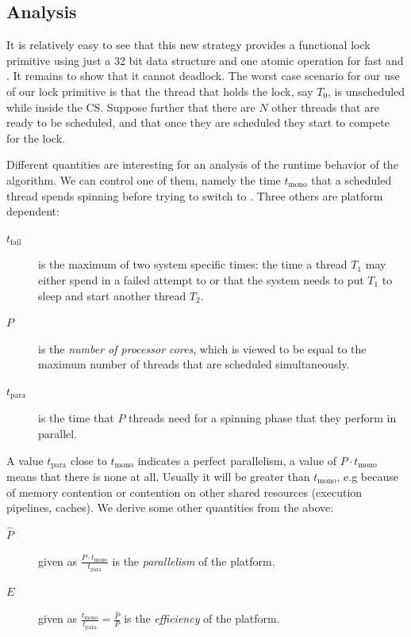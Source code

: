 \subsection{Analysis}
\label{sec-3-2}

It is relatively easy to see that this new strategy provides a
functional lock primitive using just a 32 bit data structure and
one atomic operation for fast  and . It remains to
show that it cannot deadlock.
\iflong%
The worst case scenario for our use of our lock primitive is that
the thread that holds the lock, say $T_0$, is unscheduled while
inside the CS. Suppose further that there are $N$ other threads
that are ready to be scheduled, and that once they are scheduled
they start to compete for the lock.

Different quantities are interesting for an analysis of the runtime
behavior of the algorithm. We can control one of them, namely the
time $t_{\textrm{mono}}$ that a scheduled thread spends spinning
before trying to switch to .  Three others are platform
dependent:
\fi
\itemadjust
\begin{description}
\item[{$t_{\textrm{fail}}$}] is the maximum of two system specific
times: the time a thread $T_1$ may either spend in a failed
attempt to  or that the system needs to put $T_1$
to sleep and start another thread $T_2$.\itemadjust

\item[{$P$}] is the \emph{number of processor cores}, which is viewed to be
equal to the maximum number of threads that are scheduled
simultaneously.\itemadjust

\item[{$t_{\textrm{para}}$}] is the time that $P$ threads need for a
spinning phase that they perform in parallel.\itemadjust
\end{description}

\iflong%
A value $t_{\textrm{para}}$ close to $t_{\textrm{mono}}$ indicates
a perfect parallelism, a value of $P \cdot t_{\textrm{mono}}$
means that there is none at all. Usually it will be greater than
$t_{\textrm{mono}}$, e.g because of memory contention or
contention on other shared resources (execution pipelines,
caches). We derive some other quantities from the
above:\itemadjust


\begin{description}
\item[{$\widehat{P}$}] given as $\frac{P\cdot
                       t_{\textrm{mono}}}{t_{\textrm{para}}}$ is the
\emph{parallelism} of the platform.

\item[{$E$}] given as $\frac{t_\textrm{mono}}{t_{\textrm{para}}} =
             \frac{\widehat{P}}{P}$ is the \emph{efficiency} of the
platform.
\end{description}

